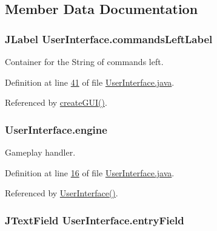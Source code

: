 \subsection{Member Data Documentation}
\hypertarget{classUserInterface_a88813d21f37fc65c1afae2250acd06d0}{
\subsubsection[{commands\-Left\-Label}]{\setlength{\rightskip}{0pt plus 5cm}J\-Label User\-Interface.\-commands\-Left\-Label\hspace{0.3cm}{\ttfamily [private]}}}\label{classUserInterface_a88813d21f37fc65c1afae2250acd06d0}


Container for the String of commands left. 



Definition at line \hyperlink{UserInterface_8java_source_l00041}{41} of file \hyperlink{UserInterface_8java_source}{User\-Interface.\-java}.



Referenced by \hyperlink{UserInterface_8java_source_l00106}{create\-G\-U\-I()}.

\hypertarget{classUserInterface_a661433c9712933f89b2cf30dfb10ffef}{
\subsubsection[{engine}]{ User\-Interface.\-engine\hspace{0.3cm}{\ttfamily [private]}}}\label{classUserInterface_a661433c9712933f89b2cf30dfb10ffef}


Gameplay handler. 



Definition at line \hyperlink{UserInterface_8java_source_l00016}{16} of file \hyperlink{UserInterface_8java_source}{User\-Interface.\-java}.



Referenced by \hyperlink{UserInterface_8java_source_l00047}{User\-Interface()}.

\hypertarget{classUserInterface_a940367d996e9e7ad6e1fa1abfe35128b}{
\subsubsection[{entry\-Field}]{\setlength{\rightskip}{0pt plus 5cm}J\-Text\-Field User\-Interface.\-entry\-Field\hspace{0.3cm}{\ttfamily [private]}}}\label{classUserInterface_a940367d996e9e7ad6e1fa1abfe35128b}


